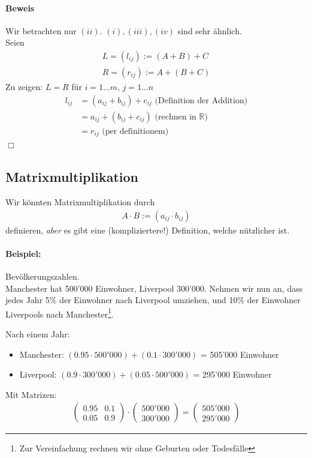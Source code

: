 \documentclass[11pt]{report}
\newcommand*\Zb[1] {\mathbb{#1}}
\begin{document}
\paragraph{Beweis}
Wir betrachten nur $(ii)$. $(i), (iii), (iv)$ sind sehr ähnlich.\\
Seien
\begin{align}
 L = (l_{ij}) := (A+B)+C \\
 R = (r_{ij}) := A + (B + C)
\end{align}
Zu zeigen: $L=R$ für $i=1...m$, $j=1...n$
\begin{align}
 l_{ij} &= (a_{ij}+b_{ij}) + c_{ij}\textrm{ (Definition der Addition)} \\
        &= a_{ij} + (b_{ij} + c_{ij})\textrm{ (rechnen in }\Zb{R}\textrm{)} \\
        &= r_{ij} \textrm{ (per definitionem)  }
\end{align} \hfill $\Box$

\subsection{Matrixmultiplikation}
Wir könnten Matrixmultiplikation durch
\begin{align}
 A \cdot B := (a_{ij}\cdot b_{ij})
\end{align}
definieren, \textit{aber} es gibt eine (kompliziertere!) Definition, welche nützlicher ist.
\paragraph{Beispiel:} Bevölkerungszahlen. \\
Manchester hat 500'000 Einwohner, Liverpool 300'000. Nehmen wir nun an, dass jedes Jahr 5\% der Einwohner nach Liverpool umziehen, und 10\% der Einwohner Liverpools nach Manchester\footnote{Zur Vereinfachung rechnen wir ohne Geburten oder Todesfälle}.

Nach einem Jahr:
\begin{itemize}
 \item Manchester: $(0.95 \cdot 500'000) + (0.1 \cdot 300'000)$ = 505'000 Einwohner
 \item Liverpool: $(0.9\cdot 300'000) + (0.05\cdot 500'000)$ = 295'000 Einwohner
\end{itemize}
Mit Matrizen:
\begin{align}
 \begin{pmatrix}
  0.95 & 0.1\\
  0.05 & 0.9
 \end{pmatrix}
\cdot 
 \begin{pmatrix}
  500'000 \\
  300'000
 \end{pmatrix}
=
 \begin{pmatrix}
  505'000 \\
  295'000
 \end{pmatrix}
\end{align}
\end{document}
